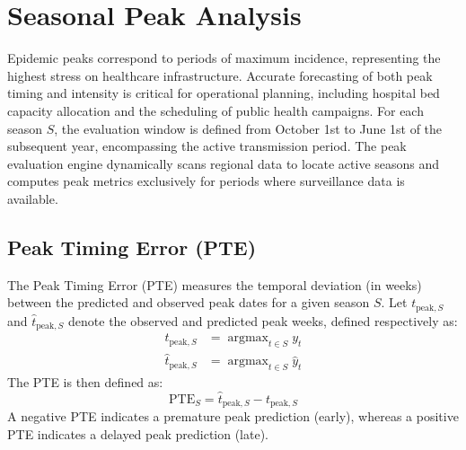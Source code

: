 \section{Seasonal Peak Analysis}

Epidemic peaks correspond to periods of maximum incidence, representing the highest stress on healthcare infrastructure. Accurate forecasting of both peak timing and intensity is critical for operational planning, including hospital bed capacity allocation and the scheduling of public health campaigns. For each season $S$, the evaluation window is defined from October 1st to June 1st of the subsequent year, encompassing the active transmission period. The peak evaluation engine dynamically scans regional data to locate active seasons and computes peak metrics exclusively for periods where surveillance data is available.

\subsection{Peak Timing Error (PTE)}
The Peak Timing Error (PTE) measures the temporal deviation (in weeks) between the predicted and observed peak dates for a given season $S$. Let $t_{\text{peak}, S}$ and $\hat{t}_{\text{peak}, S}$ denote the observed and predicted peak weeks, defined respectively as:
\begin{align}
t_{\text{peak}, S} &= \operatorname{argmax}_{t \in S} y_t \\
\hat{t}_{\text{peak}, S} &= \operatorname{argmax}_{t \in S} \hat{y}_t
\end{align}
The PTE is then defined as:
\begin{equation}
\text{PTE}_S = \hat{t}_{\text{peak}, S} - t_{\text{peak}, S}
\end{equation}
A negative PTE indicates a premature peak prediction (early), whereas a positive PTE indicates a delayed peak prediction (late).

